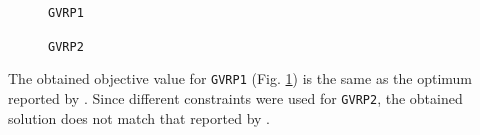 \documentclass[letterpaper,12pt,onehalfspacing,twoside]{article}
\theoremstyle{msds}
\begin{document}
\begin{figure}[htbp]
\centering
{}
\quad
{}
\caption{\texttt{GVRP1}}
\label{fig:GVRP1sol}
\end{figure}

\begin{figure}[htbp]
\centering
{}
\quad
{}
\caption{\texttt{GVRP2}}
\label{fig:GVRP2sol}
\end{figure}
The obtained objective value for \texttt{GVRP1} (Fig. \ref{fig:GVRP1sol}) is the same as the optimum reported by \cite{POP201297}. Since different constraints were used for \texttt{GVRP2}, the obtained solution does not match that reported by \cite{bektasKara}.
\end{document}
